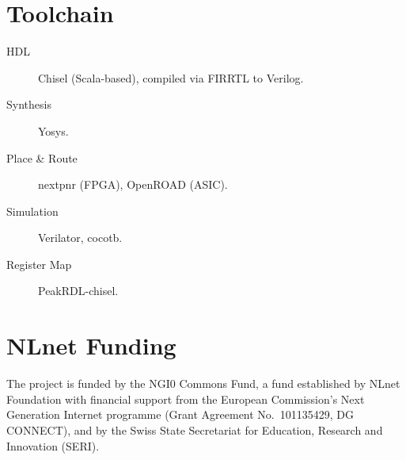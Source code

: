 \section{Toolchain}

\begin{description}
  \item[HDL] Chisel (Scala-based), compiled via FIRRTL to Verilog.
  \item[Synthesis] Yosys.
  \item[Place \& Route] nextpnr (FPGA), OpenROAD (ASIC).
  \item[Simulation] Verilator, cocotb.
  \item[Register Map] PeakRDL-chisel.
\end{description}

\section{NLnet Funding}

The \borg{} project is funded by the
NGI0 Commons Fund, a fund established by NLnet Foundation with financial
support from the European Commission's Next Generation Internet programme
(Grant Agreement No.\ 101135429, DG CONNECT), and by the Swiss State
Secretariat for Education, Research and Innovation (SERI).
